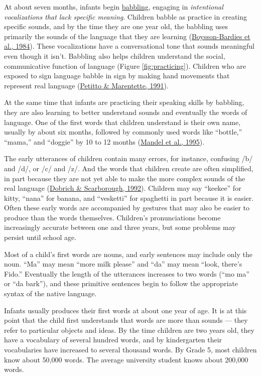 \documentclass[
]{krantz}
\begin{document}
At about seven months, infants begin \protect\hyperlink{babbling}{babbling}, engaging in \emph{intentional vocalizations that lack specific meaning}. Children babble as practice in creating specific sounds, and by the time they are one year old, the babbling uses primarily the sounds of the language that they are learning (\protect\hyperlink{ref-deBoysson-Bardies1984}{Boysson-Bardies et al., 1984}). These vocalizations have a conversational tone that sounds meaningful even though it isn't. Babbling also helps children understand the social, communicative function of language (Figure \ref{fig:practicing}). Children who are exposed to sign language babble in sign by making hand movements that represent real language (\protect\hyperlink{ref-Petitto1991}{Petitto \& Marentette, 1991}).

At the same time that infants are practicing their speaking skills by babbling, they are also learning to better understand sounds and eventually the words of language. One of the first words that children understand is their own name, usually by about six months, followed by commonly used words like ``bottle,'' ``mama,'' and ``doggie'' by 10 to 12 months (\protect\hyperlink{ref-Mandel1995}{Mandel et al., 1995}).

The early utterances of children contain many errors, for instance, confusing /b/ and /d/, or /c/ and /z/. And the words that children create are often simplified, in part because they are not yet able to make the more complex sounds of the real language (\protect\hyperlink{ref-Dobrich1992}{Dobrich \& Scarborough, 1992}). Children may say ``keekee'' for kitty, ``nana'' for banana, and ``vesketti'' for spaghetti in part because it is easier. Often these early words are accompanied by gestures that may also be easier to produce than the words themselves. Children's pronunciations become increasingly accurate between one and three years, but some problems may persist until school age.

Most of a child's first words are nouns, and early sentences may include only the noun. ``Ma'' may mean ``more milk please'' and ``da'' may mean ``look, there's Fido.'' Eventually the length of the utterances increases to two words (``mo ma'' or ``da bark''), and these primitive sentences begin to follow the appropriate syntax of the native language.

Infants usually produces their first words at about one year of age. It is at this point that the child first understands that words are more than sounds --- they refer to particular objects and ideas. By the time children are two years old, they have a vocabulary of several hundred words, and by kindergarten their vocabularies have increased to several thousand words. By Grade 5, most children know about 50,000 words. The average university student knows about 200,000 words.
\end{document}

